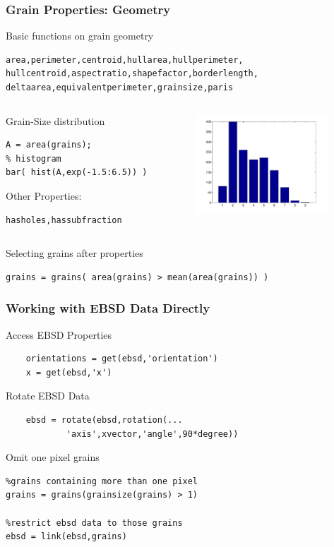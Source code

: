 %
\begin{frame}[fragile]
  \frametitle{Grain Properties: Geometry}

Basic functions on grain geometry
\begin{lstlisting}[basicstyle=\footnotesize]
area,perimeter,centroid,hullarea,hullperimeter,
hullcentroid,aspectratio,shapefactor,borderlength,
deltaarea,equivalentperimeter,grainsize,paris
\end{lstlisting}
%

\begin{columns}[t]
  \begin{column}[T]{6.5cm}
  Grain-Size distribution
\begin{lstlisting}
A = area(grains);
% histogram
bar( hist(A,exp(-1.5:6.5)) )
\end{lstlisting}

Other Properties:
\begin{lstlisting}[basicstyle=\footnotesize]
hasholes,hassubfraction
\end{lstlisting}

	\end{column}
	\begin{column}[T]{5cm}
		\includegraphics[width=5cm]{pic/grh}
	\end{column}
\end{columns}

Selecting grains after properties
\begin{lstlisting}
grains = grains( area(grains) > mean(area(grains)) )
\end{lstlisting}

\end{frame}


%
\begin{frame}[fragile]
  \frametitle{Working with EBSD Data Directly}

	Access EBSD Properties
\begin{lstlisting}
	orientations = get(ebsd,'orientation')
	x = get(ebsd,'x')
\end{lstlisting}

	\medskip

	Rotate EBSD Data
\begin{lstlisting}
	ebsd = rotate(ebsd,rotation(...
			'axis',xvector,'angle',90*degree))
\end{lstlisting}

	\medskip
        Omit one pixel grains
\begin{lstlisting}
%grains containing more than one pixel
grains = grains(grainsize(grains) > 1)

%restrict ebsd data to those grains
ebsd = link(ebsd,grains)
\end{lstlisting}

\end{frame}

